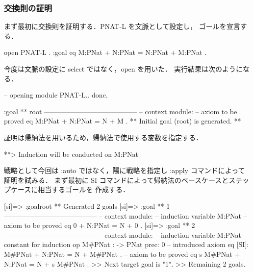 \documentclass[a4paper,oneside,10pt,here]{memoir}
\newenvironment{vvtm}%
{\parskip=0pt\lineskip=0pt\begin{center}\begin{minipage}{0.8\textwidth}\begin{snugshade}}%
  {\end{snugshade}\end{minipage}\end{center}}
\begin{document}
\subsubsection{交換則の証明}

まず最初に交換則を証明する．PNAT-L を文脈として設定し，
ゴールを宣言する．
\begin{vvtm}
  \begin{simplev}
open PNAT-L .
:goal { eq M:PNat + N:PNat = N:PNat + M:PNat . }
  \end{simplev}
\end{vvtm}
今度は文脈の設定に select ではなく，open を用いた．
実行結果は次のようになる．
\begin{vvtm}
  \begin{simplev}
-- opening module PNAT-L.. done.

:goal { ** root -----------------------------------------
  -- context module: %
  -- axiom to be proved
    eq M:PNat + N:PNat = N + M .
}
** Initial goal (root) is generated. **
  \end{simplev}
\end{vvtm}

証明は帰納法を用いるため，帰納法で使用する変数を指定する．
\begin{vvtm}
  \begin{simplev}
**> Induction will be conducted on M:PNat 
  \end{simplev}
\end{vvtm}

戦略として今回は :auto ではなく，陽に戦略を指定し :apply コマンドによって証明を試みる．
まず最初に SI コマンドによって帰納法のベースケースとステップケースに相当するゴールを
作成する．

\begin{vvtm}
  \begin{simplev}

[si]=> :goal{root}
** Generated 2 goals
[si]=>
:goal { ** 1 -----------------------------------------
  -- context module: %
  -- induction variable
    M:PNat
  -- axiom to be proved
    eq 0 + N:PNat = N + 0 .
}
[si]=>
:goal { ** 2 -----------------------------------------
  -- context module: %
  -- induction variable
    M:PNat
  -- constant for induction
    op M#PNat : -> PNat { prec: 0 }
  -- introduced axiom
    eq [SI]: M#PNat + N:PNat = N + M#PNat .
  -- axiom to be proved
    eq s M#PNat + N:PNat = N + s M#PNat .
}
>> Next target goal is "1".
>> Remaining 2 goals.
  \end{simplev}
\end{vvtm}
\end{document}
